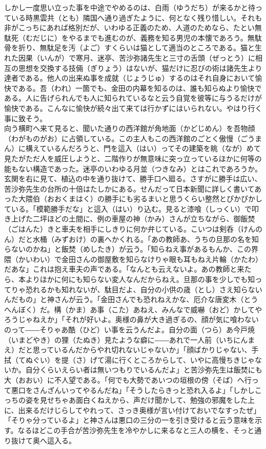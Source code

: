 \documentclass{book}
\begin{document}
しかし一度思い立った事を中途でやめるのは、白雨（ゆうだち）が来るかと待っている時黒雲共（とも）隣国へ通り過ぎたように、何となく残り惜しい。それも非がこっちにあれば格別だが、いわゆる正義のため、人道のためなら、たとい無駄死（むだじに）をやるまでも進むのが、義務を知る男児の本懐であろう。無駄骨を折り、無駄足を汚（よご）すくらいは猫として適当のところである。猫と生れた因果（いんが）で寒月、迷亭、苦沙弥諸先生と三寸の舌頭（ぜっとう）に相互の思想を交換する技倆（ぎりょう）はないが、猫だけに忍びの術は諸先生より達者である。他人の出来ぬ事を成就（じょうじゅ）するのはそれ自身において愉快である。吾（われ）一箇でも、金田の内幕を知るのは、誰も知らぬより愉快である。人に告げられんでも人に知られているなと云う自覚を彼等に与うるだけが愉快である。こんなに愉快が続々出て来ては行かずにはいられない。やはり行く事に致そう。\\
向う横町へ来て見ると、聞いた通りの西洋館が角地面（かどじめん）を吾物顔（わがものがお）に占領している。この主人もこの西洋館のごとく傲慢（ごうまん）に構えているんだろうと、門を這入（はい）ってその建築を眺（なが）めて見たがただ人を威圧しようと、二階作りが無意味に突っ立っているほかに何等の能もない構造であった。迷亭のいわゆる月並（つきなみ）とはこれであろうか。玄関を右に見て、植込の中を通り抜けて、勝手口へ廻る。さすがに勝手は広い、苦沙弥先生の台所の十倍はたしかにある。せんだって日本新聞に詳しく書いてあった大隈伯（おおくまはく）の勝手にも劣るまいと思うくらい整然とぴかぴかしている。「模範勝手だな」と這入（はい）り込む。見ると漆喰（しっくい）で叩き上げた二坪ほどの土間に、例の車屋の神（かみ）さんが立ちながら、御飯焚（ごはんた）きと車夫を相手にしきりに何か弁じている。こいつは剣呑（けんのん）だと水桶（みずおけ）の裏へかくれる。「あの教師あ、うちの旦那の名を知らないのかね」と飯焚（めしたき）が云う。「知らねえ事があるもんか、この界隈（かいわい）で金田さんの御屋敷を知らなけりゃ眼も耳もねえ片輪（かたわ）だあな」これは抱え車夫の声である。「なんとも云えないよ。あの教師と来たら、本よりほかに何にも知らない変人なんだからねえ。旦那の事を少しでも知ってりゃ恐れるかも知れないが、駄目だよ、自分の小供の歳（とし）さえ知らないんだもの」と神さんが云う。「金田さんでも恐れねえかな、厄介な唐変木（とうへんぼく）だ。構（かま）あ事（こた）あねえ、みんなで威嚇（おど）かしてやろうじゃねえか」「それが好いよ。奥様の鼻が大き過ぎるの、顔が気に喰わないのって――そりゃあ酷（ひど）い事を云うんだよ。自分の面（つら）あ今戸焼（いまどやき）の狸（たぬき）見たような癖に――あれで一人前（いちにんまえ）だと思っているんだからやれ切れないじゃないか」「顔ばかりじゃない、手拭（てぬぐい）を提（さ）げて湯に行くところからして、いやに高慢ちきじゃないか。自分くらいえらい者は無いつもりでいるんだよ」と苦沙弥先生は飯焚にも大（おおい）に不人望である。「何でも大勢であいつの垣根の傍（そば）へ行って悪口をさんざんいってやるんだね」「そうしたらきっと恐れ入るよ」「しかしこっちの姿を見せちゃあ面白くねえから、声だけ聞かして、勉強の邪魔をした上に、出来るだけじらしてやれって、さっき奥様が言い付けておいでなすったぜ」「そりゃ分っているよ」と神さんは悪口の三分の一を引き受けると云う意味を示す。なるほどこの手合が苦沙弥先生を冷やかしに来るなと三人の横を、そっと通り抜けて奥へ這入る。\\
\end{document}
